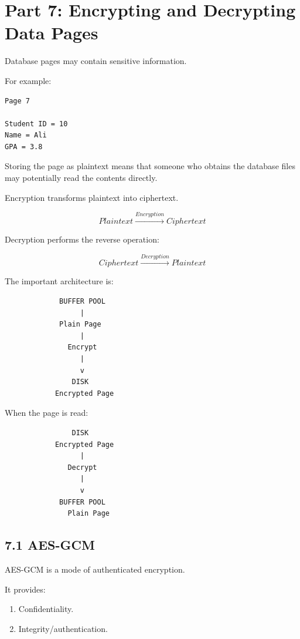 \documentclass[12pt,a4paper]{article}
\begin{document}
\section{Part 7: Encrypting and Decrypting Data Pages}

Database pages may contain sensitive information.

For example:

\begin{verbatim}
Page 7

Student ID = 10
Name = Ali
GPA = 3.8
\end{verbatim}

Storing the page as plaintext means that someone who obtains the database files may potentially read the contents directly.

Encryption transforms plaintext into ciphertext.

\[
Plaintext
\xrightarrow{Encryption}
Ciphertext
\]

Decryption performs the reverse operation:

\[
Ciphertext
\xrightarrow{Decryption}
Plaintext
\]

The important architecture is:

\begin{verbatim}
             BUFFER POOL
                  |
             Plain Page
                  |
               Encrypt
                  |
                  v
                DISK
            Encrypted Page
\end{verbatim}

When the page is read:

\begin{verbatim}
                DISK
            Encrypted Page
                  |
               Decrypt
                  |
                  v
             BUFFER POOL
               Plain Page
\end{verbatim}

\subsection{7.1 AES-GCM}

AES-GCM is a mode of authenticated encryption.

It provides:

\begin{enumerate}
    \item Confidentiality.
    \item Integrity/authentication.
\end{enumerate}
\end{document}
